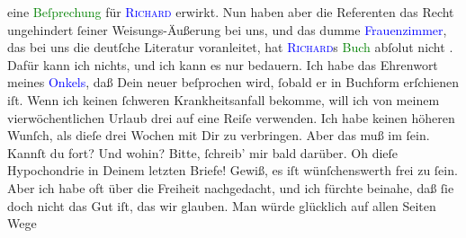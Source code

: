                eine \textcolor{green}{Beſprechung}{} für \textsc{\textcolor{blue}{Richard}{}\ledrightnote{\textcolor{blue}{Richard Beer-Hofmann}}} erwirkt. Nun haben aber die Referenten das Recht ungehindert ſeiner
               Weisungs-Äußerung bei uns, und das dumme \textcolor{blue}{Frauenzimmer}{}, das bei uns die deutſche Literatur voranleitet,
               hat \textsc{\textcolor{blue}{Richard}{}\ledrightnote{\textcolor{blue}{Richard Beer-Hofmann}}}s \strikeout{\textcolor{gray}{B}}{ }\textcolor{green}{Buch}{} abſolut nicht \label{K_L02621-44v}\label{K_L02621-44h}. Dafür kann ich nichts, und
               ich kann es nur bedauern. Ich habe das Ehrenwort meines \textcolor{blue}{Onkels}{}, daß Dein neuer \label{K_L02621-10v}\label{K_L02621-10h} beſprochen
               wird, ſobald er in Buchform erſchienen iſt.\pend
           \pstart
           Wenn ich keinen ſchweren Krankheitsanfall bekomme, will ich von meinem
               vierwöchentlichen Urlaub drei auf eine Reiſe verwenden. Ich habe keinen höheren
               Wunſch, als dieſe drei Wochen mit Dir zu verbringen. Aber das muß im \label{K_L02621-8v}\label{K_L02621-8h} ſein. Kannſt du fort?
               Und wohin? Bitte, ſchreib’ mir bald darüber.\pend
           \pstart
           {\pb}Oh dieſe Hypochondrie in Deinem letzten Briefe!
               Gewiß, es iſt wünſchenswerth frei zu ſein. Aber ich habe oft über die Freiheit
               nachgedacht, und ich fürchte beinahe, daß ſie doch nicht das Gut iſt, \introOben{}das\introOben{} wir glauben. Man würde glücklich auf allen Seiten Wege
